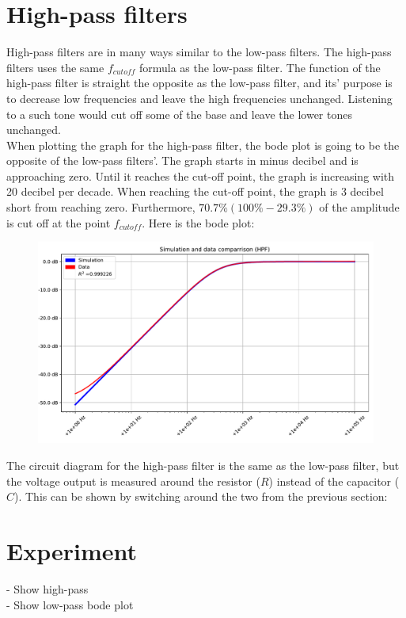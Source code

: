 \section{High-pass filters}
High-pass filters are in many ways similar to the low-pass filters. The high-pass filters uses the same $f_{cutoff}$ formula as the low-pass filter. The function of the high-pass filter is straight the opposite as the low-pass filter, and its' purpose is to decrease low frequencies and leave the high frequencies unchanged. Listening to a such tone would cut off some of the base and leave the lower tones unchanged. \\

When plotting the graph for the high-pass filter, the bode plot is going to be the opposite of the low-pass filters'. The graph starts in minus decibel and is approaching zero. Until it reaches the cut-off point, the graph is increasing with 20 decibel per decade. When reaching the cut-off point, the graph is 3 decibel short from reaching zero. Furthermore, $70.7\% (100\%-29.3\%)$ of the amplitude is cut off at the point $f_{cutoff}$. Here is the bode plot:
\begin{figure}[H]
\center
	\includegraphics[scale=0.7]{fig/img/bode_HPF_plot.pdf}
\end{figure}
The circuit diagram for the high-pass filter is the same as the low-pass filter, but the voltage output is measured around the resistor ($R$) instead of the capacitor ($C$). This can be shown by switching around the two from the previous section:
\begin{figure}[H]
	
\end{figure}

\section{Experiment}
- Show high-pass \\
- Show low-pass bode plot